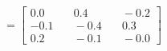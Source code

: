 \documentclass[preview]{standalone}
\begin{document}
\begin{align*}
=\begin{bmatrix} 0.0 & \quad 0.4 & \quad -0.2 \\ -0.1 & \quad -0.4 & \quad 0.3 \\ 0.2 & \quad -0.1 & \quad -0.0 \end{bmatrix}
\end{align*}
\end{document}
